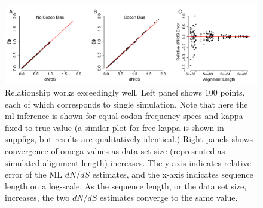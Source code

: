 \documentclass[11pt]{article}
\begin{document}





\clearpage
\newpage

	

\clearpage
\newpage	

\begin{figure}[H]
\centerline{\includegraphics[width=6in]{figures/MainText/regression_convergence.pdf}}
\caption{\label{reg_conv} Relationship works exceedingly well. Left panel shows 100 points, each of which corresponds to single simulation. Note that here the ml inference is shown for equal codon frequency specs and kappa fixed to true value (a similar plot for free kappa is shown in suppfigs, but results are qualitatively identical.) Right panels shows convergence of omega values as data set size (represented as simulated alignment length) increases. The y-axis indicates relative error of the ML $dN/dS$ estimates, and the x-axis indicates sequence length on a log-scale. As the sequence length, or the data set size, increases, the two $dN/dS$ estimates converge to the same value. }
\end{figure}
\end{document}
